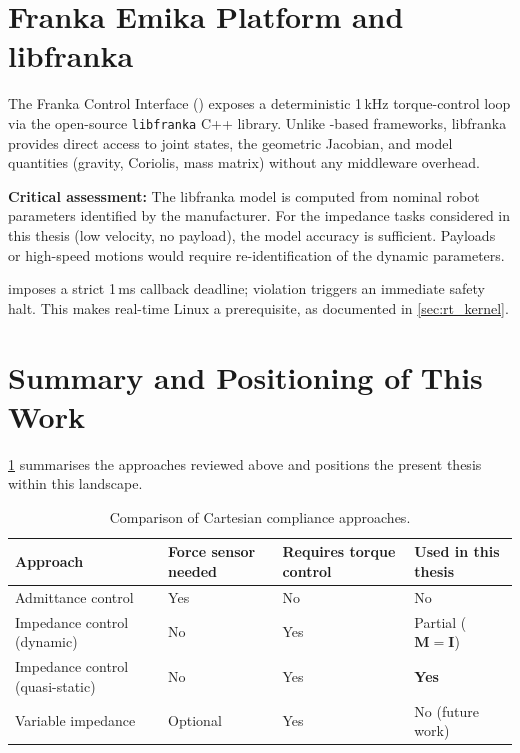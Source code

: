 \section{Franka Emika Platform and libfranka}
\label{sec:lit_franka}

The Franka Control Interface () \cite{FCI2023} exposes a deterministic
1\,kHz torque-control loop via the open-source \texttt{libfranka}
C++ library.
Unlike -based frameworks, libfranka provides direct access to
joint states, the geometric Jacobian, and model quantities (gravity,
Coriolis, mass matrix) without any middleware overhead.

\textbf{Critical assessment:} The libfranka model is computed from
nominal robot parameters identified by the manufacturer.
For the impedance tasks considered in this thesis (low velocity,
no payload), the model accuracy is sufficient.
Payloads or high-speed motions would require re-identification of
the dynamic parameters.

 imposes a strict 1\,ms callback deadline; violation triggers
an immediate safety halt.
This makes real-time Linux a prerequisite, as documented in
\cref{sec:rt_kernel}.

\section{Summary and Positioning of This Work}
\label{sec:lit_summary}

\cref{tab:lit_comparison} summarises the approaches reviewed above and
positions the present thesis within this landscape.

\begin{table}[htb]
\centering
\caption{Comparison of Cartesian compliance approaches.}
\label{tab:lit_comparison}
\renewcommand{\arraystretch}{1.4}
\begin{tabular}{@{}p{3.2cm}p{2.8cm}p{2.8cm}p{3.5cm}@{}}
\toprule
Approach & Force sensor needed & Requires torque control & Used in this thesis \\
\midrule
Admittance control & Yes & No & No \\
Impedance control (dynamic) & No & Yes & Partial ($\mathbf{M}=\mathbf{I}$) \\
Impedance control (quasi-static) & No & Yes & \textbf{Yes} \\
Variable impedance & Optional & Yes & No (future work) \\
\bottomrule
\end{tabular}
\end{table}

